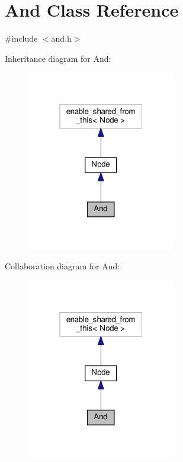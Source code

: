 \hypertarget{class_and}{}\section{And Class Reference}
\label{class_and}


{\ttfamily \#include $<$and.\+h$>$}



Inheritance diagram for And\+:\nopagebreak
\begin{figure}[H]
\begin{center}
\leavevmode
\includegraphics[width=184pt]{dc/d54/class_and__inherit__graph}
\end{center}
\end{figure}


Collaboration diagram for And\+:\nopagebreak
\begin{figure}[H]
\begin{center}
\leavevmode
\includegraphics[width=184pt]{d7/d3e/class_and__coll__graph}
\end{center}
\end{figure}
